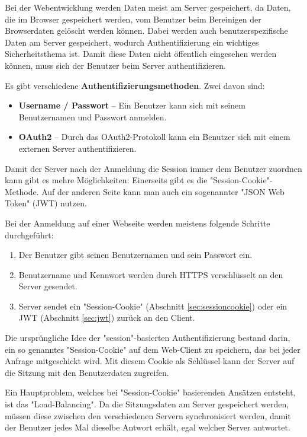 

Bei der Webentwicklung werden Daten meist am Server gespeichert, da Daten, die im Browser gespeichert werden, vom Benutzer beim Bereinigen der Browserdaten gelöscht werden können. 
Dabei werden auch benutzerspezifische Daten am Server gespeichert, wodurch Authentifizierung ein wichtiges Sicherheitsthema ist.
Damit diese Daten nicht öffentlich eingesehen werden können, muss sich der Benutzer beim Server authentifizieren.

Es gibt verschiedene \textbf{Authentifizierungsmethoden}. Zwei davon sind:
\begin{itemize} 
    \item \textbf{Username / Passwort} -- Ein Benutzer kann sich mit seinem Benutzernamen und Passwort anmelden.
    \item \textbf{OAuth2} -- Durch das OAuth2-Protokoll kann ein Benutzer sich mit einem externen Server authentifizieren. \cite{OAuth2}
\end{itemize}

Damit der Server nach der Anmeldung die Session immer dem Benutzer zuordnen kann gibt es mehre Möglichkeiten:
Einerseits gibt es die "Session-Cookie"-Methode. Auf der anderen Seite kann man auch ein sogenannter "JSON Web Token" (JWT) nutzen.

Bei der Anmeldung auf einer Webseite werden meistens folgende Schritte durchgeführt:
\begin{enumerate}
    \item Der Benutzer gibt seinen Benutzernamen und sein Passwort ein.
    \item Benutzername und Kennwort werden durch HTTPS verschlüsselt an den Server gesendet.
    \item Server sendet ein "Session-Cookie" (Abschnitt \ref{sec:sessioncookie}) oder ein JWT (Abschnitt \ref{sec:jwt}) zurück an den Client.
\end{enumerate}

\pagebreak
{}\label{sec:sessioncookie}

Die ursprüngliche Idee der "session"-basierten Authentifizierung bestand darin, ein so genanntes "Session-Cookie" auf dem Web-Client zu speichern, das bei jeder Anfrage mitgeschickt wird. Mit diesem Cookie als Schlüssel kann der Server auf die Sitzung mit den Benutzerdaten zugreifen. 

Ein Hauptproblem, welches bei "Session-Cookie" basierenden Ansätzen entsteht, ist das "Load-Balancing". 
Da die Sitzungsdaten am Server gespeichert werden, müssen diese zwischen den verschiedenen Servern synchronisiert werden, damit der Benutzer jedes Mal dieselbe Antwort erhält, egal welcher Server antwortet. 


